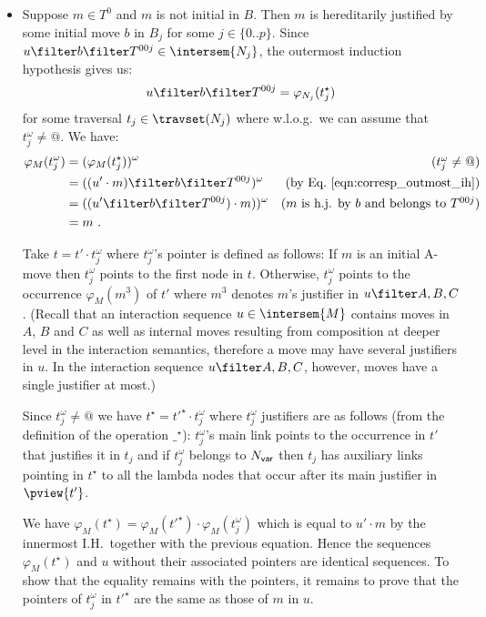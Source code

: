 \begin{enumerate}[$\bullet$]
\begin{enumerate}
\begin{itemize}
    \item Suppose $m\in T^0$ and $m$ is not initial in $B$. Then $m$ is hereditarily justified by some initial move $b$ in $B_j$ for some $j\in \{0..p\}$.
        Since $u \filter b \filter T^{00j} \in \intersem{N_j}$, the outermost induction hypothesis gives us:
        \begin{equation}
        u \filter b \filter T^{00j} = \varphi_{N_j}(t_j^\star)  \label{eqn:corresp_outmost_ih}
        \end{equation}
          for some traversal $t_j \in \travset(N_j)$ where w.l.o.g.\ we can assume that $t_j^\omega \neq @$. We have:
        \begin{align*}
            \varphi_M (t_j^\omega) &= (\varphi_M (t_j^\star))^\omega & \mbox{($t_j^\omega \neq @$)}\\
                                   &= ((u' \cdot m) \filter b\filter T^{00j})^\omega & \mbox{(by Eq.\ \ref{eqn:corresp_outmost_ih})}\\
                                   &= ((u' \filter b\filter T^{00j}) \cdot m))^\omega & \mbox{($m$ is h.j. by $b$ and belongs to $T^{00j}$)}\\
                                   &= m \ .
        \end{align*}

        Take $t = t'\cdot t_j^\omega$ where $t_j^\omega$'s pointer is defined as follows:
If $m$ is an initial A-move then $t_j^\omega$ points to the first node in $t$.
Otherwise, $t_j^\omega$ points to the occurrence $\varphi_M(m^3)$ of $t'$
where $m^3$ denotes $m$'s justifier in $u \filter A,B,C$. (Recall that an interaction sequence $u \in \intersem{M}$ contains moves in $A$, $B$ and $C$ as well as internal moves resulting from composition at deeper level in the interaction semantics,
therefore a move may have several justifiers in $u$. In the interaction sequence $u\filter A,B,C$, however, moves have a single justifier at most.)
\smallskip

Since $t_j^\omega \neq @$ we have  $t^\star = t'^\star \cdot t_j^\omega$ where 
$t_j^\omega$ justifiers are as follows (from the definition of the operation $\_^\star$):
$t_j^\omega$'s main link points to the occurrence in $t'$ that justifies it in $t_j$ and if $t_j^\omega$ belongs to $N_{\sf var}$ then $t_j$ has auxiliary links pointing in $t^\star$ to all the lambda nodes that occur after its main justifier in $\pview{t'}$.

We have $\varphi_{M}(t^\star) =  \varphi_{M}(t'^\star)  \cdot \varphi_{M}(t_j^\omega)$ which is equal to $u' \cdot m$
by the innermost I.H.\ together with the previous equation. Hence the sequences $\varphi_{M}(t^\star)$ and $u$ 
without their associated pointers are identical sequences.
To show that the equality remains with the pointers, it remains to prove that the pointers of $t_j^\omega$ in $t'^\star$ are the same as those of $m$ in $u$.


\end{itemize}
\end{enumerate}
\end{enumerate}
